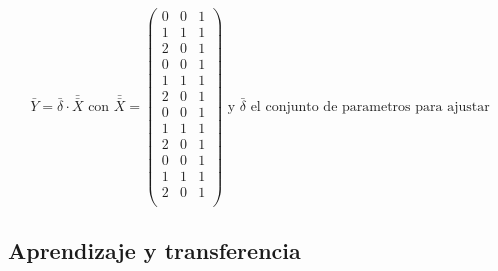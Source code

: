 \documentclass{article}
\begin{document}
\begin{equation} \label{ec:MatrizIntermedio}
    \bar {Y} = \bar{\delta} \cdot \bar{\bar{X}} \text{ con } \bar{\bar{X}} =
     \begin{pmatrix}
        0 & 0 & 1\\
        1 & 1 & 1\\
        2 & 0 & 1\\
        0 & 0 & 1\\
        1 & 1 & 1\\
        2 & 0 & 1\\
        0 & 0 & 1\\
        1 & 1 & 1\\
        2 & 0 & 1\\
        0 & 0 & 1\\
        1 & 1 & 1\\
        2 & 0 & 1\\
     \end{pmatrix} \text{ y $\bar{\delta}$ el conjunto de parametros para ajustar}
 \end{equation}
 
\subsection{Aprendizaje y transferencia}
\end{document}
